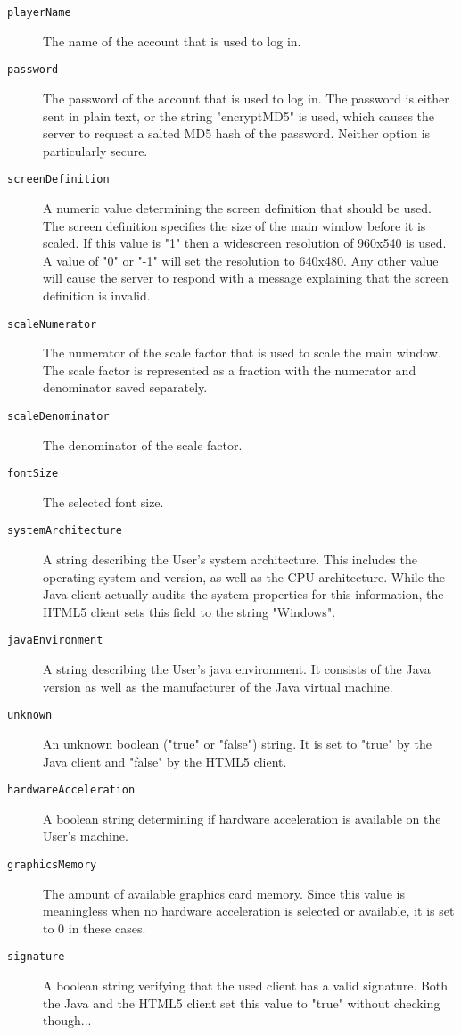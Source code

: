 \documentclass{article}
\newcommand{\field}[1]{\textcolor{fieldColor}{\texttt{#1}}}
\begin{document}
\begin{description}
\item [\field{playerName}] The name of the account that is used to log in.
\item [\field{password}] The password of the account that is used to log in. The password is either sent in plain text, or the string "encryptMD5" is used, which causes the server to request 
a salted MD5 hash of the password. Neither option is particularly secure.
\item [\field{screenDefinition}] A numeric value determining the screen definition that should be used. The screen definition specifies the size of the main window before it is scaled. 
If this value is "1" then a widescreen resolution of 960x540 is used. A value of "0" or "-1" will set the resolution to 640x480. Any other value will cause the server to respond with a message
explaining that the screen definition is invalid.
\item [\field{scaleNumerator}] The numerator of the scale factor that is used to scale the main window. The scale factor is represented as a fraction with the numerator and denominator saved 
separately.
\item [\field{scaleDenominator}] The denominator of the scale factor.
\item [\field{fontSize}] The selected font size.
\item [\field{systemArchitecture}] A string describing the User's system architecture. This includes the operating system and version, as well as the CPU architecture. While the Java client actually
audits the system properties for this information, the HTML5 client sets this field to the string "Windows".
\item [\field{javaEnvironment}] A string describing the User's java environment. It consists of the Java version as well as the manufacturer of the Java virtual machine.
\item [\field{unknown}] An unknown boolean ("true" or "false") string. It is set to "true" by the Java client and "false" by the HTML5 client.
\item [\field{hardwareAcceleration}] A boolean string determining if hardware acceleration is available on the User's machine. 
\item [\field{graphicsMemory}] The amount of available graphics card memory. Since this value is meaningless when no hardware acceleration is selected or available, it is set to 0 in these cases.
\item [\field{signature}] A boolean string verifying that the used client has a valid signature. Both the Java and the HTML5 client set this value to "true" without checking though...
\end{description}
\end{document}
